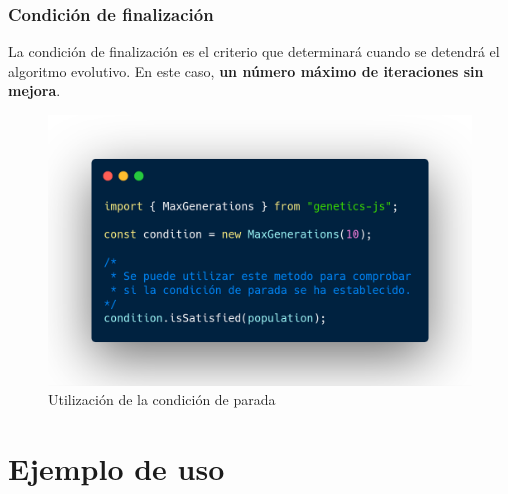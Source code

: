 \documentclass{beamer}
\begin{document}
\begin{frame}
\frametitle{Condición de finalización}

La condición de finalización es el criterio que determinará cuando se detendrá el algoritmo evolutivo. En este caso, \textbf{un número máximo de iteraciones sin mejora}.

\begin{figure}
    \centering
    \includegraphics[scale=0.22]{pres/img/desarrollo/termination-example.png}
    \caption{Utilización de la condición de parada}
    \label{fig:my_label}
\end{figure}

\end{frame}

\section{Ejemplo de uso}
\end{document}
